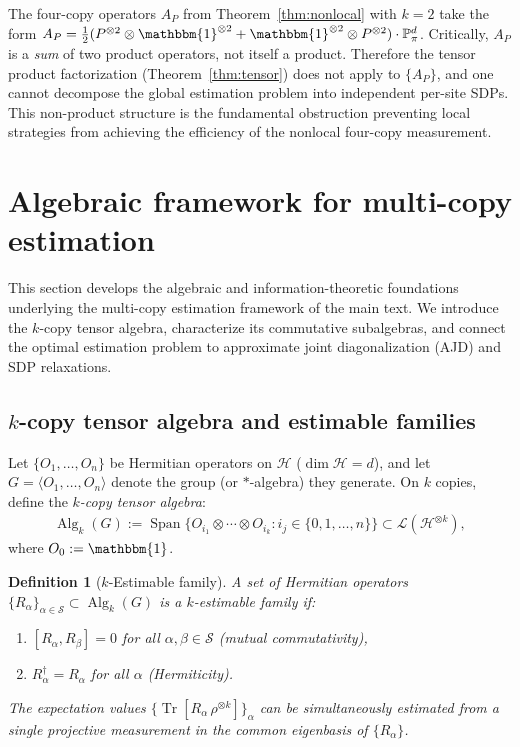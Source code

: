 \documentclass[aps,%
twocolumn,%
floatfix,%
pra,%
amsfonts,%
groupedaddress,%
superscriptaddress]{revtex4-2}%
\newtheorem{definition}{Definition}[section]
\DeclareMathOperator{\tr}{Tr}
\DeclareMathOperator{\Sp}{Span}
\newcommand{\ox}{\otimes}
\newcommand{\1}{\mathbbm{1}}
\newcommand{\gen}[1]{\langle #1\rangle}
\newcommand*{\cH}{\mathcal{H}}
\newcommand*{\cS}{\mathcal{S}}
\newcommand*{\bP}{\mathbb{P}}
\newcommand*{\cL}{\mathcal{L}}
\DeclareMathOperator{\Alg}{Alg}
\begin{document}
The four-copy operators $A_P$ from Theorem~\ref{thm:nonlocal} with $k=2$ take the form $A_P = \frac{1}{2}(P^{\ox 2}\ox\1^{\ox 2} + \1^{\ox 2}\ox P^{\ox 2})\cdot\bP_\pi^d$. Critically, $A_P$ is a \emph{sum} of two product operators, not itself a product. Therefore the tensor product factorization (Theorem~\ref{thm:tensor}) does not apply to $\{A_P\}$, and one cannot decompose the global estimation problem into independent per-site SDPs. This non-product structure is the fundamental obstruction preventing local strategies from achieving the efficiency of the nonlocal four-copy measurement.



\section{Algebraic framework for multi-copy estimation}\label{app:alg_framework}

This section develops the algebraic and information-theoretic foundations underlying the multi-copy estimation framework of the main text. We introduce the $k$-copy tensor algebra, characterize its commutative subalgebras, and connect the optimal estimation problem to approximate joint diagonalization (AJD) and SDP relaxations.

\subsection{$k$-copy tensor algebra and estimable families}\label{app:tensor_algebra}

Let $\{O_1, \ldots, O_n\}$ be Hermitian operators on $\cH$ ($\dim\cH = d$), and let $G = \gen{O_1, \ldots, O_n}$ denote the group (or $*$-algebra) they generate. On $k$ copies, define the \emph{$k$-copy tensor algebra}:
\begin{align}
\Alg_k(G) := \Sp\{O_{i_1}\ox\cdots\ox O_{i_k} : i_j \in \{0,1,\ldots,n\}\} \subset \cL(\cH^{\ox k}),
\end{align}
where $O_0 := \1$.

\begin{definition}[$k$-Estimable family]\label{def:k-estimable}
A set of Hermitian operators $\{R_\alpha\}_{\alpha \in \cS} \subset \Alg_k(G)$ is a \emph{$k$-estimable family} if:
\begin{enumerate}[label=(\roman*)]
\item $[R_\alpha, R_\beta] = 0$ for all $\alpha,\beta \in \cS$ (mutual commutativity),
\item $R_\alpha^\dagger = R_\alpha$ for all $\alpha$ (Hermiticity).
\end{enumerate}
The expectation values $\{\tr[R_\alpha\,\rho^{\ox k}]\}_\alpha$ can be simultaneously estimated from a single projective measurement in the common eigenbasis of $\{R_\alpha\}$.
\end{definition}
\end{document}
